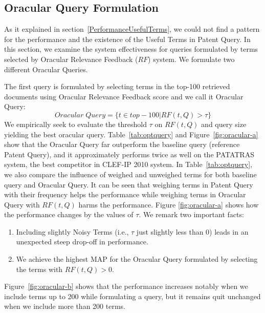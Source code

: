 \subsection{Oracular Query Formulation}
\label{sec:OracularQueryFormulation}
As it explained in section~\ref{PerformanceUsefulTerms}, we could not find a pattern for the performance and the existence of the Useful Terms in Patent Query.
In this section, we examine the system effectiveness for queries formulated by terms selected by Oracular Relevance Feedback ($\mathit{RF}$) system.
We formulate two different Oracular Queries.

The first query is formulated by selecting terms in the top-100 retrieved documents using Oracular Relevance Feedback score  and we call it Oracular Query:
\begin{equation}
Oracular \; Query = \{t \in top-100|RF(t, Q)>\tau\}   
 \label{eq:score}
\end{equation}
We empirically seek to evaluate the threshold $\tau$ on $RF(t,Q)$ and query size yielding the best oracular query.
Table~\ref{tab:optquery} and Figure~\ref{fig:oracular-a} show that the Oracular Query far outperform the baseline query (reference Patent Query), and it approximately performs twice as well on the PATATRAS system, the best competitor in CLEF-IP 2010 system. In Table~\ref{tab:optquery}, we also compare the influence of weighed and unweighed terms for both baseline query and Oracular Query. It can be seen that weighing terms in Patent Query with their frequency helps the performance while weighing terms in Oracular Query with $RF(t, Q)$ harms the performance. 
Figure \ref{fig:oracular-a} shows how the performance changes by the values of $\tau$. We remark two important facts: 
\begin{enumerate}
\item Including slightly Noisy Terms (i.e., $\tau$ just slightly less than 0) leads in an unexpected steep drop-off in performance.  
\item We achieve the highest MAP for the Oracular Query formulated by selecting the terms with $RF(t, Q)>0$.
\end{enumerate}
Figure~\ref{fig:oracular-b} shows that the performance increases notably when we include terms up to 200 while formulating a query, but it remains quit unchanged when we include more than 200 terms. 

